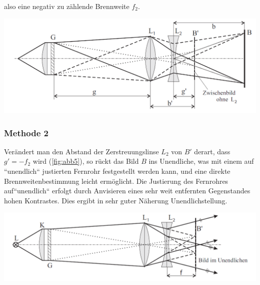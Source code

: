 \documentclass[11pt,ngerman]{scrartcl}
\begin{document}
also eine negativ zu zählende Brennweite $f_2$.

\begin{center}
	\begin{minipage}[t]{\textwidth}
		\centering
		\includegraphics[width=\textwidth]{abb4}
		\label{fig:abb4}
	\end{minipage}
\end{center}


\subsubsection{Methode 2}

Verändert man den Abstand der Zerstreuungslinse $L_2$ von $B'$ derart, dass $g' = -f_2$ wird (\autoref{fig:abb5}),
so rückt das Bild $B$ ins Unendliche, was mit einem auf
``unendlich`` justierten Fernrohr festgestellt
werden kann, und eine direkte Brennweitenbestimmung leicht ermöglicht.
Die Justierung des Fernrohres auf``unendlich`` erfolgt durch Anvisieren eines sehr weit entfernten
Gegenstandes hohen Kontrastes. Dies ergibt in sehr guter Näherung Unendlichstellung.

\begin{center}
	\begin{minipage}[t]{\textwidth}
		\centering
		\includegraphics[width=\textwidth]{abb5}
		\label{fig:abb5}
	\end{minipage}
\end{center}
\end{document}
